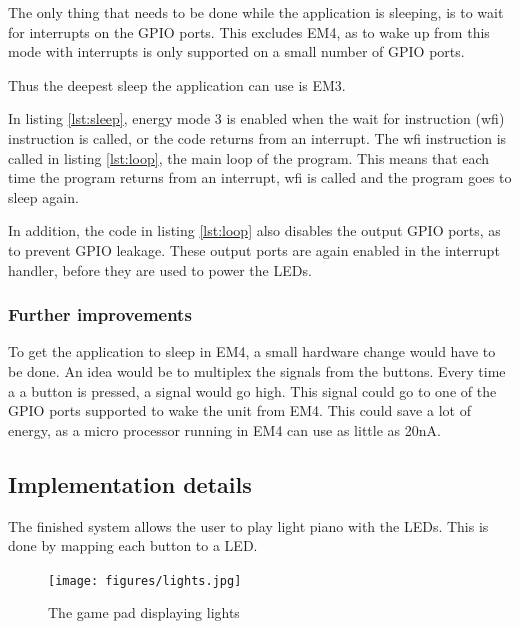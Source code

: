 The only thing that needs to be done while the application is sleeping, is to wait for interrupts on the GPIO ports.
This excludes EM4, as to wake up from this mode with interrupts is only supported on a small number of GPIO ports.

Thus the deepest sleep the application can use is EM3.



In listing \ref{lst:sleep}, energy mode 3 is enabled when the wait for instruction (wfi) instruction is called, or the code returns from an interrupt.
The wfi instruction is called in listing \ref{lst:loop}, the main loop of the program. 
This means that each time the program returns from an interrupt, wfi is called and the program goes to sleep again.



In addition, the code in listing \ref{lst:loop} also disables the output GPIO ports, as to prevent GPIO leakage.\cite{energy} 
These output ports are again enabled in the interrupt handler, before they are used to power the LEDs.

\subsubsection{Further improvements}

To get the application to sleep in EM4, a small hardware change would have to be done.
An idea would be to multiplex the signals from the buttons.
Every time a a button is pressed, a signal would go high.
This signal could go to one of the GPIO ports supported to wake the unit from EM4.
This could save a lot of energy, as a micro processor running in EM4 can use as little as 20nA.\cite{modes}

\subsection{Implementation details}

The finished system allows the user to play light piano with the LEDs.
This is done by mapping each button to a LED.

\begin{figure}[H]
\centering
\texttt{[image: figures/lights.jpg]}
\caption{The game pad displaying lights}
\label{fig:pad}

\end{figure}
